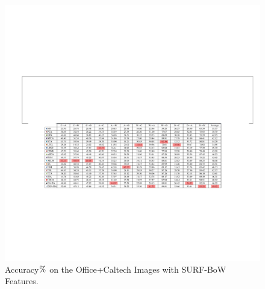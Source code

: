 \documentclass[journal,twocolumn]{IEEEtran}
\begin{document}
\begin{CJK*}{UTF8}{gkai}
\begin{itemize}
	
	\begin{figure}[h!]
		\centering
		\includegraphics[width=0.9\linewidth]{SOFFICE.pdf}
		\caption { Accuracy${\rm{\% }}$ on the Office+Caltech Images with SURF-BoW Features.} 
		\label{fig:accSO}
	\end{figure} 		





\end{itemize}
\end{CJK*}
\end{document}
